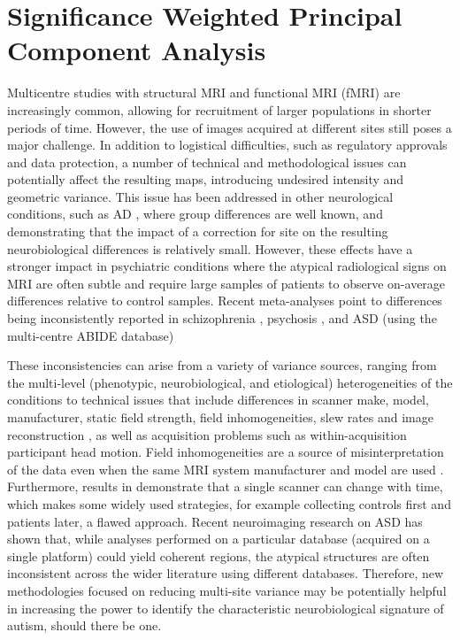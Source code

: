 \chapter{Significance Weighted Principal Component Analysis}\label{ch:swpca}
Multicentre studies with structural \ac{MRI} and functional \ac{MRI} (f\ac{MRI}) are increasingly common, allowing for recruitment of larger populations in shorter periods of time. However, the use of images acquired at different sites still poses a major challenge. In addition to logistical difficulties, such as regulatory approvals and data protection, a number of technical and methodological issues can potentially affect the resulting maps, introducing undesired intensity and geometric variance. This issue has been addressed in other neurological conditions, such as \ac{AD} \cite{Jovicich2006,Stonnington2008}, where group differences are well known, and demonstrating that the impact of a correction for site on the resulting neurobiological differences is relatively small. However, these effects have a stronger impact in psychiatric conditions where the atypical radiological signs on \ac{MRI} are often subtle and require large samples of patients to observe on-average differences relative to control samples. Recent meta-analyses point to differences being inconsistently reported in schizophrenia \cite{friedman2006report,Turner2013}, psychosis \cite{Clementz2015,Wang2015}, and \ac{ASD} (using the multi-centre ABIDE database) \cite{haar2014anatomical}

These inconsistencies can arise from a variety of variance sources, ranging from the multi-level (phenotypic, neurobiological, and etiological) heterogeneities of the conditions to technical issues that include differences in scanner make, model, manufacturer, static field strength, field inhomogeneities, slew rates and image reconstruction \cite{VanHorn2009}, as well as acquisition problems such as within-acquisition participant head motion. Field inhomogeneities are a source of misinterpretation of the data even when the same \ac{MRI} system manufacturer and model are used \cite{VanHorn2009}. Furthermore, results in \cite{Pearlson2009} demonstrate that a single scanner can change with time, which makes some widely used strategies, for example collecting controls first and patients later, a flawed approach. Recent neuroimaging research on \ac{ASD} \cite{haar2014anatomical} has shown that, while analyses performed on a particular database (acquired on a single platform) could yield coherent regions, the atypical structures are often inconsistent across the wider literature using different databases. Therefore, new methodologies focused on reducing multi-site variance may be potentially helpful in increasing the power to identify the characteristic neurobiological signature of autism, should there be one. 

